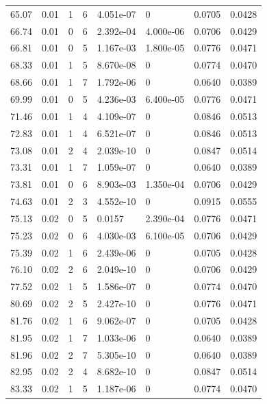 \documentclass[preview]{standalone}
\begin{document}
{{{\begin{tabular}{L{1.2cm}C{1.2cm} C{0.3cm}C{0.5cm} C{1.4cm}C{1.4cm} C{1.4cm}C{1.4cm}}
  65.07  &  0.01  & 1     &  6 &  4.051e-07  & 0  & 0.0705 &  0.0428   \\ 
  66.74  &  0.01  & 0     &  6 &  2.392e-04  & 4.000e-06  & 0.0706 &  0.0429   \\ 
  66.81  &  0.01  & 0     &  5 &  1.167e-03  & 1.800e-05  & 0.0776 &  0.0471   \\ 
  68.33  &  0.01  & 1     &  5 &  8.670e-08  & 0  & 0.0774 &  0.0470   \\ 
  68.66  &  0.01  & 1     &  7 &  1.792e-06  & 0  & 0.0640 &  0.0389   \\ 
  69.99  &  0.01  & 0     &  5 &  4.236e-03  & 6.400e-05  & 0.0776 &  0.0471   \\ 
  71.46  &  0.01  & 1     &  4 &  4.109e-07  & 0  & 0.0846 &  0.0513   \\ 
  72.83  &  0.01  & 1     &  4 &  6.521e-07  & 0  & 0.0846 &  0.0513   \\ 
  73.08  &  0.01  & 2     &  4 &  2.039e-10  & 0  & 0.0847 &  0.0514   \\ 
  73.31  &  0.01  & 1     &  7 &  1.059e-07  & 0  & 0.0640 &  0.0389   \\ 
  73.81  &  0.01  & 0     &  6 &  8.903e-03  & 1.350e-04  & 0.0706 &  0.0429   \\ 
  74.63  &  0.01  & 2     &  3 &  4.552e-10  & 0  & 0.0915 &  0.0555   \\ 
  75.13  &  0.02  & 0     &  5 &  0.0157  & 2.390e-04  & 0.0776 &  0.0471   \\ 
  75.23  &  0.02  & 0     &  6 &  4.030e-03  & 6.100e-05  & 0.0706 &  0.0429   \\ 
  75.39  &  0.02  & 1     &  6 &  2.439e-06  & 0  & 0.0705 &  0.0428   \\ 
  76.10  &  0.02  & 2     &  6 &  2.049e-10  & 0  & 0.0706 &  0.0429   \\ 
  77.52  &  0.02  & 1     &  5 &  1.586e-07  & 0  & 0.0774 &  0.0470   \\ 
  80.69  &  0.02  & 2     &  5 &  2.427e-10  & 0  & 0.0776 &  0.0471   \\ 
  81.76  &  0.02  & 1     &  6 &  9.062e-07  & 0  & 0.0705 &  0.0428   \\ 
  81.95  &  0.02  & 1     &  7 &  1.033e-06  & 0  & 0.0640 &  0.0389   \\ 
  81.96  &  0.02  & 2     &  7 &  5.305e-10  & 0  & 0.0640 &  0.0389   \\ 
  82.95  &  0.02  & 2     &  4 &  8.682e-10  & 0  & 0.0847 &  0.0514   \\ 
  83.33  &  0.02  & 1     &  5 &  1.187e-06  & 0  & 0.0774 &  0.0470   \\ 

\end{tabular}}}}
\end{document}
